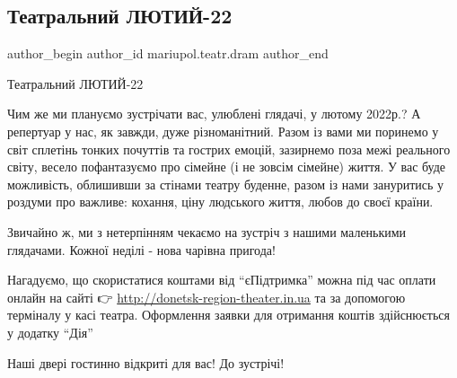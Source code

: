  
 
 
 
 

\subsection{Театральний ЛЮТИЙ-22}
\label{sec:28_01_2022.fb.mariupol.teatr.dram.1.teatralnyj_ljutyj_22}

\ifcmt
 author_begin
   author_id mariupol.teatr.dram
 author_end
\fi

Театральний ЛЮТИЙ-22

Чим же ми плануємо зустрічати вас, улюблені глядачі, у лютому 2022р.? А
репертуар у нас, як завжди, дуже різноманітний. Разом із вами ми поринемо у
світ  сплетінь тонких почуттів та гострих емоцій, зазирнемо поза межі реального
світу, весело пофантазуємо про сімейне (і не зовсім сімейне) життя. У вас буде
можливість, облишивши за стінами театру буденне, разом із нами зануритись у
роздуми про важливе: кохання, ціну людського життя, любов до своєї країни.

Звичайно ж, ми з нетерпінням чекаємо на зустріч з нашими маленькими глядачами.
Кожної неділі - нова чарівна пригода!

Нагадуємо, що скористатися коштами від \enquote{єПідтримка} можна під час оплати онлайн
на сайті 👉 \url{http://donetsk-region-theater.in.ua} та за допомогою терміналу у
касі театра. Оформлення заявки для отримання коштів здійснюється у додатку
\enquote{Дія}

Наші двері гостинно відкриті для вас! До зустрічі!

